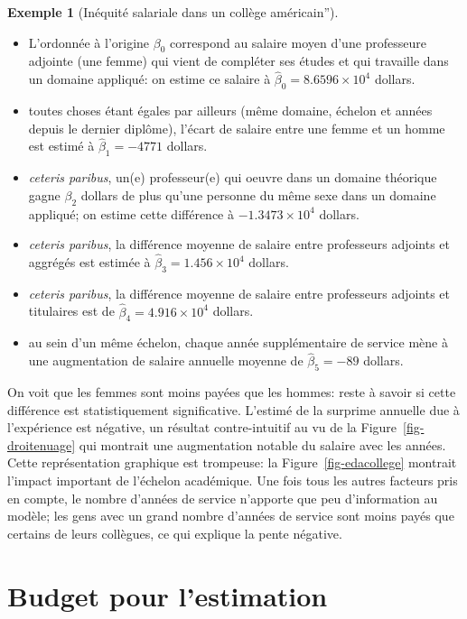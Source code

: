 \documentclass[
  11pt,
  letterpaper,
]{scrbook}
\providecommand{\tightlist}{%
  \setlength{\itemsep}{0pt}\setlength{\parskip}{0pt}}\usepackage{longtable,booktabs,array}
\theoremstyle{definition}
\newtheorem{example}{Exemple}[chapter]
\theoremstyle{remark}
\begin{document}
\begin{example}[Inéquité salariale dans un collège
américain'']
\begin{itemize}
\tightlist
\item
  L'ordonnée à l'origine \(\beta_0\) correspond au salaire moyen d'une
  professeure adjointe (une femme) qui vient de compléter ses études et
  qui travaille dans un domaine appliqué: on estime ce salaire à
  \(\widehat{\beta}_0=\ensuremath{8.6596\times 10^{4}}\) dollars.
\item
  toutes choses étant égales par ailleurs (même domaine, échelon et
  années depuis le dernier diplôme), l'écart de salaire entre une femme
  et un homme est estimé à \(\widehat{\beta}_1=-4771\) dollars.
\item
  \emph{ceteris paribus}, un(e) professeur(e) qui oeuvre dans un domaine
  théorique gagne \(\beta_2\) dollars de plus qu'une personne du même
  sexe dans un domaine appliqué; on estime cette différence à
  \(\ensuremath{-1.3473\times 10^{4}}\) dollars.
\item
  \emph{ceteris paribus}, la différence moyenne de salaire entre
  professeurs adjoints et aggrégés est estimée à
  \(\widehat{\beta}_3=\ensuremath{1.456\times 10^{4}}\) dollars.
\item
  \emph{ceteris paribus}, la différence moyenne de salaire entre
  professeurs adjoints et titulaires est de
  \(\widehat{\beta}_4=\ensuremath{4.916\times 10^{4}}\) dollars.
\item
  au sein d'un même échelon, chaque année supplémentaire de service mène
  à une augmentation de salaire annuelle moyenne de
  \(\widehat{\beta}_5=-89\) dollars.
\end{itemize}

On voit que les femmes sont moins payées que les hommes: reste à savoir
si cette différence est statistiquement significative. L'estimé de la
surprime annuelle due à l'expérience est négative, un résultat
contre-intuitif au vu de la Figure~\ref{fig-droitenuage} qui montrait
une augmentation notable du salaire avec les années. Cette
représentation graphique est trompeuse: la Figure~\ref{fig-edacollege}
montrait l'impact important de l'échelon académique. Une fois tous les
autres facteurs pris en compte, le nombre d'années de service n'apporte
que peu d'information au modèle; les gens avec un grand nombre d'années
de service sont moins payés que certains de leurs collègues, ce qui
explique la pente négative.

\end{example}

\section{Budget pour l'estimation}\label{budget-pour-lestimation}
\end{document}

